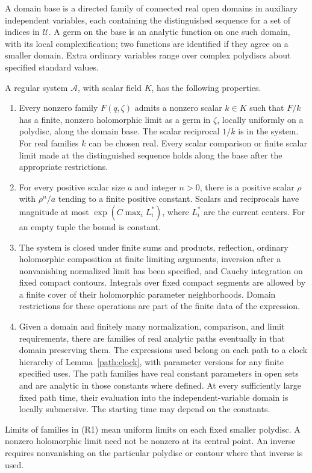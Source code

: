 \begin{definition}\label{path:def-regular}
A domain base is a directed family of connected real open domains in
auxiliary independent variables, each containing the distinguished
sequence for a set of indices in \(\mathcal U\).  A germ on the base is
an analytic function on one such domain, with its local complexification;
two functions are identified if they agree on a smaller domain.  Extra
ordinary variables range over complex polydiscs about specified standard
values.

A regular system \(\mathcal A\), with scalar field \(K\), has the
following properties.
\begin{enumerate}[label=\textup{(R\arabic*)}]
\item Every nonzero family \(F(q,\zeta)\) admits a nonzero scalar
\(k\in K\) such that \(F/k\) has a finite, nonzero holomorphic limit
as a germ in \(\zeta\), locally uniformly on a polydisc, along the
domain base.  The scalar reciprocal \(1/k\) is in the system.  For
real families \(k\) can be chosen real.  Every scalar comparison or
finite scalar limit made at the distinguished sequence holds along the
base after the appropriate restrictions.
\item For every positive scalar size \(a\) and integer \(n>0\), there
is a positive scalar \(\rho\) with \(\rho^n/a\) tending to a finite
positive constant.  Scalars and reciprocals have magnitude at most
\(\exp(C\max_i L_i^*)\), where \(L_i^*\) are the current centers.
For an empty tuple the bound is constant.
\item The system is closed under finite sums and products, reflection,
ordinary holomorphic composition at finite limiting arguments, inversion
after a nonvanishing normalized limit has been specified, and Cauchy
integration on fixed compact contours.  Integrals over fixed compact
segments are allowed by a finite cover of their holomorphic parameter
neighborhoods.  Domain restrictions for these operations are part of
the finite data of the expression.
\item Given a domain and finitely many normalization, comparison, and
limit requirements, there are families of real analytic paths eventually
in that domain preserving them.  The expressions used belong on each
path to a clock hierarchy of Lemma~\ref{path:clock}, with parameter
versions for any finite specified uses.  The path families have real
constant parameters in open sets and are analytic in those constants
where defined.  At every sufficiently large fixed path time, their
evaluation into the independent-variable domain is locally submersive.
The starting time may depend on the constants.
\end{enumerate}
Limits of families in \textup{(R1)} mean uniform limits on each fixed
smaller polydisc.  A nonzero holomorphic limit need not be nonzero at
its central point.  An inverse requires nonvanishing on the particular
polydisc or contour where that inverse is used.
\end{definition}

